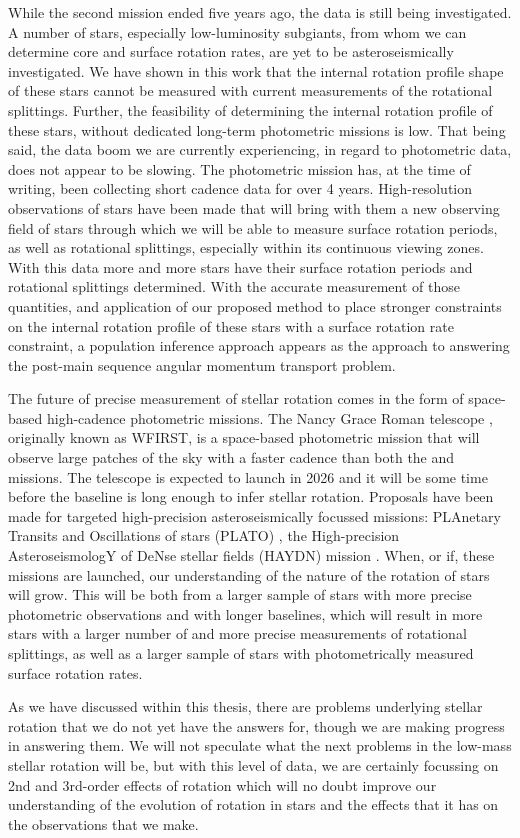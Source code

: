While the second \kepler{} mission ended five years ago, the data is still being investigated.
A number of stars, especially low-luminosity subgiants, from whom we can determine core and surface rotation rates, are yet to be asteroseismically investigated.
We have shown in this work that the internal rotation profile shape of these stars cannot be measured with current measurements of the rotational splittings.
Further, the feasibility of determining the internal rotation profile of these stars, without dedicated long-term photometric missions is low.
That being said, the data boom we are currently experiencing, in regard to photometric data, does not appear to be slowing.
The \tess{} photometric mission has, at the time of writing, been collecting short cadence data for over 4 years.
High-resolution observations of stars have been made that will bring with them a new observing field of stars through which we will be able to measure surface rotation periods, as well as rotational splittings, especially within its continuous viewing zones.
With this data more and more stars have their surface rotation periods \citep{claytor_recovery_2023} and rotational splittings determined.
With the accurate measurement of those quantities, and application of our proposed method to place stronger constraints on the internal rotation profile of these stars with a surface rotation rate constraint, a population inference approach appears as the approach to answering the post-main sequence angular momentum transport problem.

The future of precise measurement of stellar rotation comes in the form of space-based high-cadence photometric missions.
The Nancy Grace Roman telescope \citep{akeson_wide_2019}, originally known as WFIRST, is a space-based photometric mission that will observe large patches of the sky with a faster cadence than both the \kepler and \tess{} missions.
The telescope is expected to launch in 2026 and it will be some time before the baseline is long enough to infer stellar rotation.
Proposals have been made for targeted high-precision asteroseismically focussed missions: PLAnetary Transits and Oscillations of stars (PLATO) \citep{rauer_plato_2014}, the High-precision AsteroseismologY of DeNse stellar fields (HAYDN) mission \citep{miglio_haydn_2021}.
When, or if, these missions are launched, our understanding of the nature of the rotation of stars will grow.
This will be both from a larger sample of stars with more precise photometric observations and with longer baselines, which will result in more stars with a larger number of and more precise measurements of rotational splittings, as well as a larger sample of stars with photometrically measured surface rotation rates.

As we have discussed within this thesis, there are problems underlying stellar rotation that we do not yet have the answers for, though we are making progress in answering them.
We will not speculate what the next problems in the low-mass stellar rotation will be, but with this level of data, we are certainly focussing on 2nd and 3rd-order effects of rotation which will no doubt improve our understanding of the evolution of rotation in stars and the effects that it has on the observations that we make.

